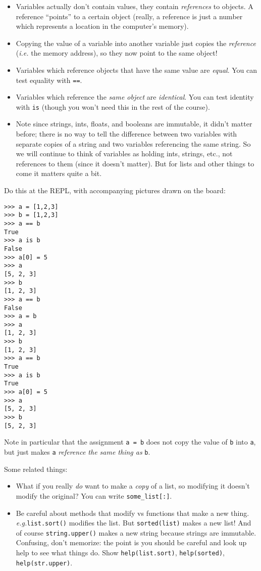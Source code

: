 \documentclass{article}
\newcommand{\eg}{\emph{e.g.}\xspace}
\begin{document}
\begin{itemize}
\item Variables actually don't contain values, they contain
  \emph{references} to objects.  A reference ``points'' to a certain
  object (really, a reference is just a number which represents a
  location in the computer's memory).
\item Copying the value of a variable into another variable just
  copies the \emph{reference} (\emph{i.e.} the memory address), so they now
  point to the same object!
\item Variables which reference objects that have the same value are
  \emph{equal}.  You can test equality with \verb|==|.
\item Variables which reference the \emph{same object} are
  \emph{identical}. You can test identity with \verb|is| (though you
  won't need this in the rest of the course).
\item Note since strings, ints, floats, and booleans are immutable, it
  didn't matter before; there is no way to tell the difference between
  two variables with separate copies of a string and two variables
  referencing the same string.  So we will continue to think of
  variables as holding ints, strings, etc., not references to them
  (since it doesn't matter).  But for lists and other things to come
  it matters quite a bit.
\end{itemize}

Do this at the REPL, with accompanying pictures drawn on the board:
\begin{verbatim}
>>> a = [1,2,3]
>>> b = [1,2,3]
>>> a == b
True
>>> a is b
False
>>> a[0] = 5
>>> a
[5, 2, 3]
>>> b
[1, 2, 3]
>>> a == b
False
>>> a = b
>>> a
[1, 2, 3]
>>> b
[1, 2, 3]
>>> a == b
True
>>> a is b
True
>>> a[0] = 5
>>> a
[5, 2, 3]
>>> b
[5, 2, 3]
\end{verbatim}
Note in particular that the assignment \verb|a = b| does not copy the
value of \verb|b| into \verb|a|, but just makes \verb|a|
\emph{reference the same thing as} \verb|b|.

Some related things:
\begin{itemize}
\item What if you really \emph{do} want to make a \emph{copy} of a
  list, so modifying it doesn't modify the original?  You can write
  \verb|some_list[:]|.
\item Be careful about methods that modify vs functions that make a
  new thing.  \eg \verb|list.sort()| modifies the list.  But
  \verb|sorted(list)| makes a new list!  And of course
  \verb|string.upper()| makes a new string because strings are
  immutable.  Confusing, don't memorize: the point is you should be
  careful and look up help to see what things do.  Show
  \verb|help(list.sort)|, \verb|help(sorted)|, \verb|help(str.upper)|.
\end{itemize}
\end{document}
